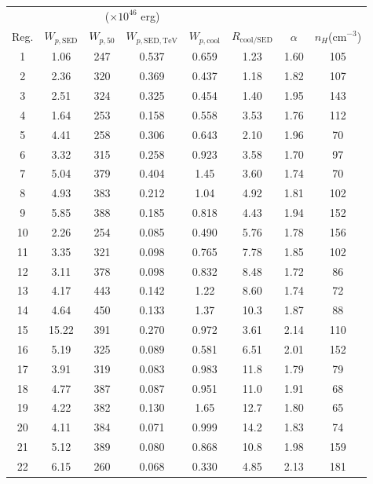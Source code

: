 \documentclass[12pt,a4paper]{article}
\begin{document}
\begin{table}[H] 
	\begin{center}
		\begin{tabular}{cccccccc}
			\toprule
			&
			\multicolumn{4}{c}{($\times 10^{46}$ erg)} 
			&&&
			\\ \cline{2-5}
			Reg. & $W_{p,\mathrm{SED}}$ & $W_{p,50}$ & $W_{p,\mathrm{SED}, \mathrm{TeV}}$ & $W_{p,\mathrm{cool}}$ & $R_{\mathrm{cool/SED}}$ & $\alpha$ & $n_H$(cm$^{-3}$)  \\
			\hline
			1 & 1.06 & 247 & 0.537 & 0.659 & 1.23 & 1.60 & 105 \\ 
			2 & 2.36 & 320 & 0.369 & 0.437 & 1.18 & 1.82 & 107 \\ 
			3 & 2.51 & 324 & 0.325 & 0.454 & 1.40 & 1.95 & 143 \\ 
			4 & 1.64 & 253 & 0.158 & 0.558 & 3.53 & 1.76 & 112 \\ 
			5 & 4.41 & 258 & 0.306 & 0.643 & 2.10 & 1.96 & 70 \\ 
			6 & 3.32 & 315 & 0.258 & 0.923 & 3.58 & 1.70 & 97 \\ 
			7 & 5.04 & 379 & 0.404 & 1.45 & 3.60 & 1.74 & 70 \\ 
			8 & 4.93 & 383 & 0.212 & 1.04 & 4.92 & 1.81 & 102 \\ 
			9 & 5.85 & 388 & 0.185 & 0.818 & 4.43 & 1.94 & 152 \\ 
			10 & 2.26 & 254 & 0.085 & 0.490 & 5.76 & 1.78 & 156 \\ 
			11 & 3.35 & 321 & 0.098 & 0.765 & 7.78 & 1.85 & 102 \\ 
			12 & 3.11 & 378 & 0.098 & 0.832 & 8.48 & 1.72 & 86 \\ 
			13 & 4.17 & 443 & 0.142 & 1.22 & 8.60 & 1.74 & 72 \\ 
			14 & 4.64 & 450 & 0.133 & 1.37 & 10.3 & 1.87 & 88 \\ 
			15 & 15.22 & 391 & 0.270 & 0.972 & 3.61 & 2.14 & 110 \\ 
			16 & 5.19 & 325 & 0.089 & 0.581 & 6.51 &  2.01 & 152 \\ 
			17 & 3.91 & 319 & 0.083 & 0.983 & 11.8 & 1.79 & 79 \\ 
			18 & 4.77 & 387 & 0.087 & 0.951 & 11.0 & 1.91 & 68 \\ 
			19 & 4.22 & 382 & 0.130 & 1.65 & 12.7 & 1.80 & 65 \\ 
			20 & 4.11 & 384 & 0.071 & 0.999 & 14.2 & 1.83 & 74 \\ 
			21 & 5.12 & 389 & 0.080 & 0.868 & 10.8 & 1.98 & 159 \\ 
			22 & 6.15 & 260 & 0.068 & 0.330 & 4.85 & 2.13 & 181 \\ 

\end{tabular}
\end{center}
\end{table}
\end{document}
